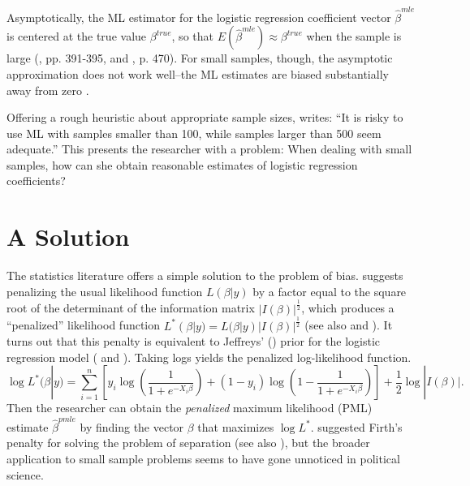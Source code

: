 \documentclass[12pt]{article}
\begin{document}
Asymptotically, the ML estimator for the logistic regression coefficient vector $\hat{\beta}^{mle}$ is centered at the true value $\beta^{true}$, so that $E(\hat{\beta}^{mle}) \approx \beta^{true}$ when the sample is large (\citealt{Wooldridge2002}, pp. 391-395, and \citealt{CasellaBerger2002}, p. 470).
For small samples, though, the asymptotic approximation does not work well--the ML estimates are biased substantially away from zero \citep[pp. 53-54]{Long1997}.

Offering a rough heuristic about appropriate sample sizes, \cite[p. 54]{Long1997} writes: ``It is risky to use ML with samples smaller than 100, while samples larger than 500 seem adequate.''
This presents the researcher with a problem: When dealing with small samples, how can she obtain reasonable estimates of logistic regression coefficients?

\section*{A Solution}

The statistics literature offers a simple solution to the problem of bias. 
\cite{Firth1993} suggests penalizing the usual likelihood function $L(\beta | y)$ by a factor equal to the square root of the determinant of the information matrix $|I(\beta)|^\frac{1}{2}$, which produces a ``penalized'' likelihood function $L^*(\beta | y) = L(\beta | y)|I(\beta)|^\frac{1}{2}$ (see also \citealt{KosmidisFirth2009} and \citealt{Kosmidis2014}). 
It turns out that this penalty is equivalent to Jeffreys' (\citeyear{Jeffreys1946}) prior for the logistic regression model (\citealt{Firth1993} and \citealt{Poirier1994}).
Taking logs yields the penalized log-likelihood function.
\begin{equation}\nonumber
\log L^*(\beta | y) = \displaystyle \sum_{i = 1}^n \left[y_i \log \left( \dfrac{1}{1 + e^{-X_i\beta}}\right) + (1 - y_i) \log \left(1 - \dfrac{1}{1 + e^{-X_i\beta}}\right)\right] + \dfrac{1}{2} \log |I(\beta)|.
\end{equation}
Then the researcher can obtain the \emph{penalized} maximum likelihood (PML) estimate $\hat{\beta}^{pmle}$ by finding the vector $\beta$ that maximizes $\log L^*$. 
\cite{Zorn2005} suggested Firth's penalty for solving the problem of separation (see also \citealt{Rainey-separation}), but the broader application to small sample problems seems to have gone unnoticed in political science.
\end{document}
